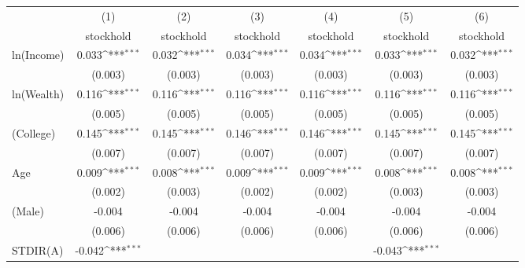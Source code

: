 {
\def\sym#1{\ifmmode^{#1}\else\(^{#1}\)\fi}
\begin{tabular}{l*{6}{c}}
\toprule
                    &\multicolumn{1}{c}{(1)}&\multicolumn{1}{c}{(2)}&\multicolumn{1}{c}{(3)}&\multicolumn{1}{c}{(4)}&\multicolumn{1}{c}{(5)}&\multicolumn{1}{c}{(6)}\\
                    &\multicolumn{1}{c}{stockhold}&\multicolumn{1}{c}{stockhold}&\multicolumn{1}{c}{stockhold}&\multicolumn{1}{c}{stockhold}&\multicolumn{1}{c}{stockhold}&\multicolumn{1}{c}{stockhold}\\
\midrule
ln(Income)          &       0.033\sym{***}&       0.032\sym{***}&       0.034\sym{***}&       0.034\sym{***}&       0.033\sym{***}&       0.032\sym{***}\\
                    &     (0.003)         &     (0.003)         &     (0.003)         &     (0.003)         &     (0.003)         &     (0.003)         \\
\addlinespace
ln(Wealth)          &       0.116\sym{***}&       0.116\sym{***}&       0.116\sym{***}&       0.116\sym{***}&       0.116\sym{***}&       0.116\sym{***}\\
                    &     (0.005)         &     (0.005)         &     (0.005)         &     (0.005)         &     (0.005)         &     (0.005)         \\
\addlinespace
1(College)          &       0.145\sym{***}&       0.145\sym{***}&       0.146\sym{***}&       0.146\sym{***}&       0.145\sym{***}&       0.145\sym{***}\\
                    &     (0.007)         &     (0.007)         &     (0.007)         &     (0.007)         &     (0.007)         &     (0.007)         \\
\addlinespace
Age                 &       0.009\sym{***}&       0.008\sym{***}&       0.009\sym{***}&       0.009\sym{***}&       0.008\sym{***}&       0.008\sym{***}\\
                    &     (0.002)         &     (0.003)         &     (0.002)         &     (0.002)         &     (0.003)         &     (0.003)         \\
\addlinespace
1(Male)             &      -0.004         &      -0.004         &      -0.004         &      -0.004         &      -0.004         &      -0.004         \\
                    &     (0.006)         &     (0.006)         &     (0.006)         &     (0.006)         &     (0.006)         &     (0.006)         \\
\addlinespace
STDIR(A)            &      -0.042\sym{***}&                     &                     &                     &      -0.043\sym{***}&                     \\

\end{tabular}}
